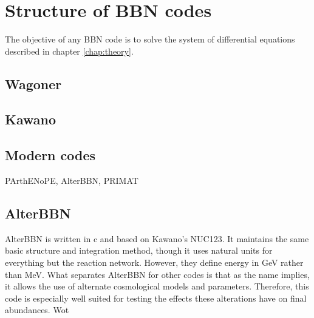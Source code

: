 \section{Structure of BBN codes}
\label{sec:BBN_structure}

The objective of any BBN code is to solve the system of differential equations described in chapter \ref{chap:theory}.

\subsection{Wagoner}
\label{sec:Wagoner}

\subsection{Kawano}
\label{sec:Kawano}

\subsection{Modern codes}
\label{sec:Modern_codes}
PArthENoPE, AlterBBN, PRIMAT


\subsection{AlterBBN}
\label{sec:AlterBBN}

AlterBBN is written in c and based on Kawano's NUC123. It maintains the same basic structure and integration method, though it uses natural units for everything but the reaction network. However, they define energy in GeV rather than MeV. What separates AlterBBN for other codes is that as the name implies, it allows the use of alternate cosmological models and parameters. Therefore, this code is especially well suited for testing the effects these alterations have on final abundances. Wot
